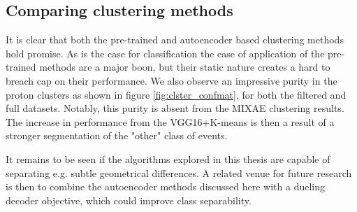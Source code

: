 \subsection{Comparing clustering methods}

It is clear that both the pre-trained and autoencoder based clustering methods hold promise. As is the case for classification the ease of application of the pre-trained methods are a major boon, but their static nature creates a hard to breach cap on their performance. We also observe an impressive purity in the proton clusters as shown in figure \ref{fig:clster_confmat}, for both the filtered and full datasets. Notably, this purity is absent from the MIXAE clustering results. The increase in performance from the VGG16+K-means is then a result of a stronger segmentation of the "other" class of events.

It remains to be seen if the algorithms explored in this thesis are capable of separating e.g. subtle geometrical differences. A related venue for future research is then to combine the autoencoder methods discussed here with a dueling decoder objective, which could improve class separability.

